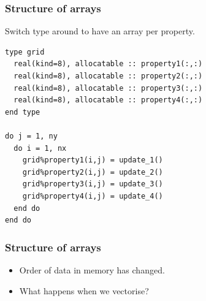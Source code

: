 \documentclass{beamer}
\begin{document}
\begin{frame}[fragile]
\frametitle{Structure of arrays}
Switch type around to have an array per property.
\begin{verbatim}
type grid
  real(kind=8), allocatable :: property1(:,:)
  real(kind=8), allocatable :: property2(:,:)
  real(kind=8), allocatable :: property3(:,:)
  real(kind=8), allocatable :: property4(:,:)
end type

do j = 1, ny
  do i = 1, nx
    grid%property1(i,j) = update_1()
    grid%property2(i,j) = update_2()
    grid%property3(i,j) = update_3()
    grid%property4(i,j) = update_4()
  end do
end do
\end{verbatim}
\end{frame}

\begin{frame}
\frametitle{Structure of arrays}
\begin{itemize}
  \item Order of data in memory has changed.
  \item<2-> What happens when we vectorise?
\end{itemize}

\begin{adjustbox}{max width={\textwidth}}
\end{adjustbox}

\end{frame}
\end{document}
